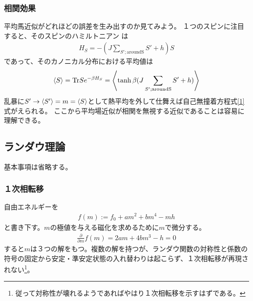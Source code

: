 \documentclass[autodetect-engine,dvipdfmx-if-dvi,ja=standard]{bxjsarticle}
\theoremstyle{break}
\begin{document}
            \subsubsection{相関効果}
                平均馬近似がどれほどの誤差を生み出すのか見てみよう。
                １つのスピンに注目すると、そのスピンのハミルトニアン は
                \begin{align}
                    H_S=-(J\sum_{S';\mathrm{around S}}S' +h)S
                \end{align}
                であって、そのカノニカル分布における平均値は
                \begin{align}
                    \braket{S}=\mathrm{Tr}Se^{-\beta H_S}=\left\langle  \tanh \beta(J\sum_{S';\mathrm{around S}}S' +h)\right\rangle
                \end{align}
                乱暴に$S'\to\braket{S'}=m=\braket{S}$として熱平均を外して仕舞えば自己無撞着方程式\eqref{1}式がえられる。
                ここから平均場近似が相関を無視する近似であることは容易に理解できる。
        \subsection{ランダウ理論}
            基本事項は省略する。
            \subsubsection{１次相転移}
                自由エネルギーを
                \begin{align}
                    f(m):=f_0 +am^2 +bm^4 -mh
                \end{align}
                と書き下す。$m$の極値を与える磁化を求めるために$m$で微分する。
                \begin{align}
                    \frac{\partial}{\partial m}f(m)=2am +4bm^3 -h=0
                \end{align}
                すると$m$は３つの解をもつ。複数の解を持つが、ランダウ関数の対称性と係数の符号の固定から安定・準安定状態の入れ替わりは起こらず、１次相転移が再現されない\footnote{従って対称性が壊れるようであればやはり１次相転移を示すはずである。}。
\end{document}
